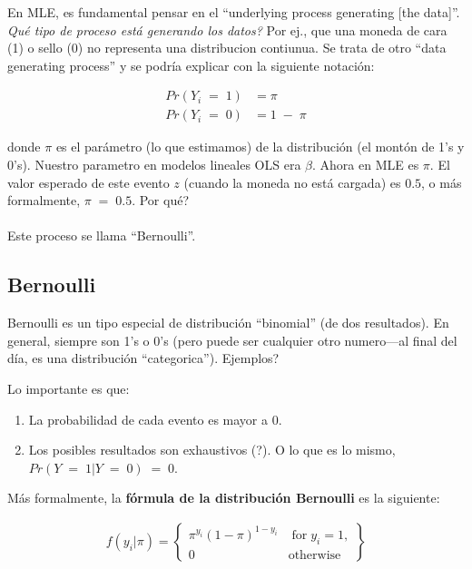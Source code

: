 \documentclass[onesided]{article}\usepackage[]{graphicx}\usepackage[]{color}
\begin{document}
En MLE, es fundamental pensar en el ``underlying process generating [the data]''. \emph{Qu\'e tipo de proceso est\'a generando los datos?} Por ej., que una moneda de cara (1) o sello (0) no representa una distribucion contiunua. Se trata de otro ``data generating process'' y se podr\'ia explicar con la siguiente notaci\'on:

\begin{equation} 
\begin{split}
Pr(Y_{i} \;=\; 1) & = \pi \\
Pr(Y_{i} \;=\; 0) & = 1\;-\;\pi 
\end{split}
\end{equation}

donde $\pi$ es el par\'ametro (lo que estimamos) de la distribuci\'on (el mont\'on de 1's y 0's). Nuestro parametro en modelos lineales OLS era $\beta$. Ahora en MLE es $\pi$. El valor esperado de este evento $z$ (cuando la moneda no est\'a cargada) es $0.5$, o m\'as formalmente, $\pi\;=\;0.5$. {\color{red}Por qu\'e?}

\paragraph{}Este proceso se llama ``Bernoulli''.

\subsection{Bernoulli}

Bernoulli es un tipo especial de distribuci\'on ``binomial'' (de dos resultados). En general, siempre son 1's o 0's (pero puede ser cualquier otro numero---al final del d\'ia, es una distribuci\'on ``categorica''). {\color{red}Ejemplos?} 

Lo importante es que:

\begin{enumerate}
\item La probabilidad de cada evento es mayor a 0. 
\item Los posibles resultados son {\color{red}exhaustivos (?)}. O lo que es lo mismo, $Pr(Y\;=\;1 | Y\;=\;0)\;=\;0$.
\end{enumerate}

M\'as formalmente, la {\bf f\'ormula de la distribuci\'on Bernoulli} es la siguiente:

\begin{equation}\label{Bernoulli}
\begin{split}
f(y_{i}|\pi) =	\begin{Bmatrix} \pi^{y_{i}}(1-\pi)^{1-y_{i}} & \;\text{for}\; y_{i}=1, \\ 
0 & \text{otherwise} \end{Bmatrix}
\end{split}
\end{equation}
\end{document}
